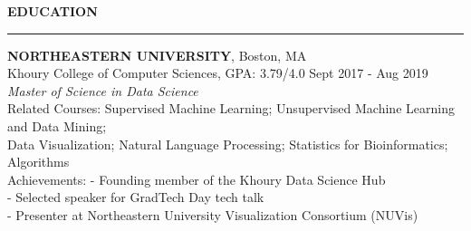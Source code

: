 \documentclass[a4paper]{article}
\newcommand{\myline}{\par
  \kern2pt %
  \hrule height 0.5pt
  \kern2pt %
}
\newcommand{\mybullet}{
	\indent 
  \textbullet \hspace*{2mm}
}
\begin{document}

	\noindent
	{\large \textbf{EDUCATION}}
	\myline 
	\smallskip
	
	\noindent
	\textbf{NORTHEASTERN UNIVERSITY}, Boston, MA \\
	Khoury College of Computer Sciences, GPA: 3.79/4.0 
        \hfill Sept 2017 - Aug 2019 \\
	\textit{Master of Science in Data Science} \\
        Related Courses: Supervised Machine Learning; 
        Unsupervised Machine Learning and Data Mining; \\
        \hspace*{23.9mm} Data Visualization;
        Natural Language Processing;
        Statistics for Bioinformatics; Algorithms \\
  Achievements: - Founding member of the Khoury Data Science Hub \\%
  \hspace*{21.2mm} - Selected speaker for GradTech Day tech talk \\%
              \hspace*{21.2mm} - Presenter at Northeastern University Visualization Consortium (NUVis)\\ %
\end{document}
